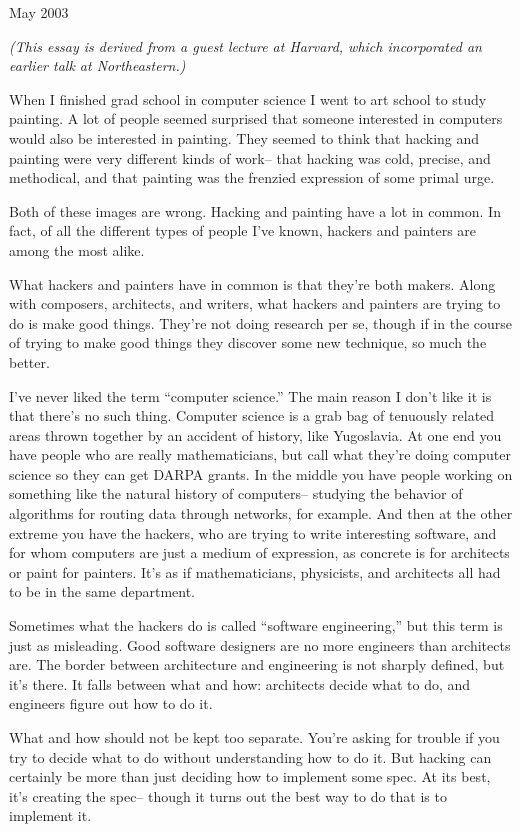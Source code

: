 \documentclass[12pt]{book}
\begin{document}
May 2003

\emph{(This essay is derived from a guest lecture at Harvard, which
incorporated an earlier talk at Northeastern.)}

When I finished grad school in computer science I went to art school to
study painting. A lot of people seemed surprised that someone interested
in computers would also be interested in painting. They seemed to think
that hacking and painting were very different kinds of work-- that
hacking was cold, precise, and methodical, and that painting was the
frenzied expression of some primal urge.

Both of these images are wrong. Hacking and painting have a lot in
common. In fact, of all the different types of people I've known,
hackers and painters are among the most alike.

What hackers and painters have in common is that they're both makers.
Along with composers, architects, and writers, what hackers and painters
are trying to do is make good things. They're not doing research per se,
though if in the course of trying to make good things they discover some
new technique, so much the better.

I've never liked the term ``computer science.'' The main reason I don't
like it is that there's no such thing. Computer science is a grab bag of
tenuously related areas thrown together by an accident of history, like
Yugoslavia. At one end you have people who are really mathematicians,
but call what they're doing computer science so they can get DARPA
grants. In the middle you have people working on something like the
natural history of computers-- studying the behavior of algorithms for
routing data through networks, for example. And then at the other
extreme you have the hackers, who are trying to write interesting
software, and for whom computers are just a medium of expression, as
concrete is for architects or paint for painters. It's as if
mathematicians, physicists, and architects all had to be in the same
department.

Sometimes what the hackers do is called ``software engineering,'' but
this term is just as misleading. Good software designers are no more
engineers than architects are. The border between architecture and
engineering is not sharply defined, but it's there. It falls between
what and how: architects decide what to do, and engineers figure out how
to do it.

What and how should not be kept too separate. You're asking for trouble
if you try to decide what to do without understanding how to do it. But
hacking can certainly be more than just deciding how to implement some
spec. At its best, it's creating the spec-- though it turns out the best
way to do that is to implement it.
\end{document}
